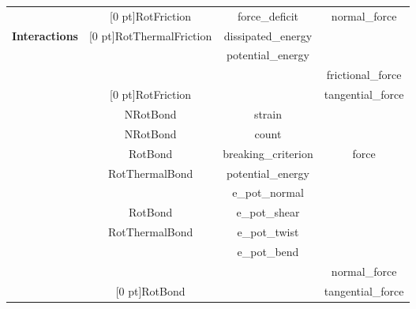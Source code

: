\begin{table}[h]
\begin{center}
\begin{tabular}{|c|c|c|c|}
  & \raisebox{1.25 ex}[0 pt]{RotFriction} & force\_deficit & normal\_force\\
  \textbf{Interactions} & \raisebox{1.25 ex}[0 pt]{RotThermalFriction} & dissipated\_energy & \\
  &  & potential\_energy & \\
  \cline{2-4}
  &  &  & frictional\_force\\
  & \raisebox{1.25 ex}[0 pt]{RotFriction} &  & tangential\_force\\
  \cline{2-4}
  & NRotBond & strain & \\
  \cline{2-4}
  & NRotBond & count & \\
  & RotBond & breaking\_criterion & force\\
  & RotThermalBond & potential\_energy & \\
  \cline{2-4}
  &  & e\_pot\_normal & \\
  & RotBond & e\_pot\_shear & \\
  & RotThermalBond & e\_pot\_twist & \\
  &  & e\_pot\_bend & \\
  \cline{2-4}
  &  &  & normal\_force\\
  & \raisebox{1.25 ex}[0 pt]{RotBond} &  & tangential\_force\\
  \hline
\end{tabular}
\end{center}
\end{table}

